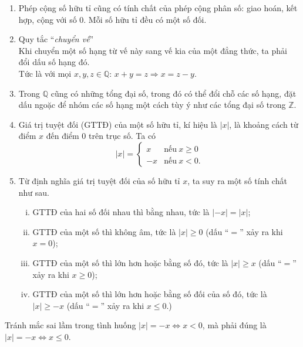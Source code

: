 \begin{enumerate}[1)]
\begin{enumerate}[\tickEX]
\end{enumerate}
\item Phép cộng số hữu tỉ cũng có tính chất của phép cộng phân số: giao hoán, kết hợp, cộng với số $0$. Mỗi số hữu tỉ đều có một số đối.
\item Quy tắc ``\textit{chuyển vế}''\\
Khi chuyển một số hạng từ vế này sang vế kia của một đẳng thức, ta phải đổi dấu số hạng đó.\\
Tức là với mọi $x,y,z\in\mathbb{Q}$: $x+y=z\Rightarrow x=z-y$.
\item Trong $\mathbb{Q}$ cũng có những tổng đại số, trong đó có thể đổi chỗ các số hạng, đặt dấu ngoặc để nhóm các số hạng một cách tùy ý như các tổng đại số trong $\mathbb{Z}$.
\item Giá trị tuyệt đối (GTTĐ) của một số hữu tỉ, kí hiệu là $|x|$, là khoảng cách từ điểm $x$ đến điểm $0$ trên trục số. Ta có
\[|x|=\begin{cases}
x&\text{nếu}\: x\geq0\\
-x&\text{nếu}\: x<0.
\end{cases}\]
\item Từ định nghĩa giá trị tuyệt đối của số hữu tỉ $x$, ta suy ra một số tính chất như sau.
\begin{enumerate}[(i)]
	\item GTTĐ của hai số đối nhau thì bằng nhau, tức là $|-x|=|x|$;
	\item GTTĐ của một số thì không âm, tức là $|x| \geq 0$ (dấu ``$=$'' xảy ra khi $x=0$);
	\item GTTĐ của một số thì lớn hơn hoặc bằng số đó, tức là $|x| \geq x$ (dấu ``$=$'' xảy ra khi $x \geq 0$);
	\item GTTĐ của một số thì lớn hơn hoặc bằng số đối của số đó, tức là $|x| \geq -x$ (dấu ``$=$'' xảy ra khi $x \leq 0$.)
\end{enumerate}
\end{enumerate}
\begin{note}
Tránh mắc sai lầm trong tình huống $|x|=-x \Leftrightarrow x<0$, mà phải đúng là $|x|=-x \Leftrightarrow x \leq 0$.
\end{note}

